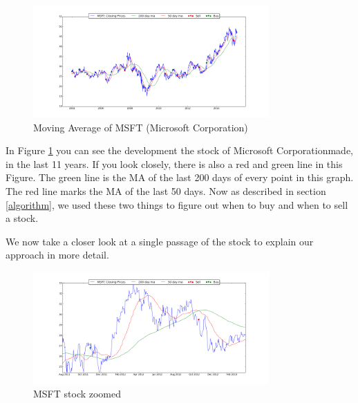 \documentclass[conference]{IEEEtran}
\begin{document}
\begin{figure}[!h]
  \includegraphics{MSFT_MA}
  \caption{Moving Average of MSFT (Microsoft Corporation)}
  \label{fig:MSFT_MA}
\end{figure}

 In Figure \ref{fig:MSFT_MA} you can see the development the stock of Microsoft Corporation\texttrademark made, in the last 11 years. If you look closely, there is also a red and green line in this Figure. The green line is the MA of the last 200 days of every point in this graph. The  red line marks the MA of the last 50 days. Now as described in section \ref{algorithm}, we used these two things to figure out when to buy and when to sell a stock.

We now take a closer look at a single passage of the stock to explain our approach in more detail.

\begin{figure}[!h]
  \includegraphics{MSFT_Zoomed}
  \caption{MSFT stock zoomed}
  \label{fig:MSFT_Z}
\end{figure}
\end{document}

